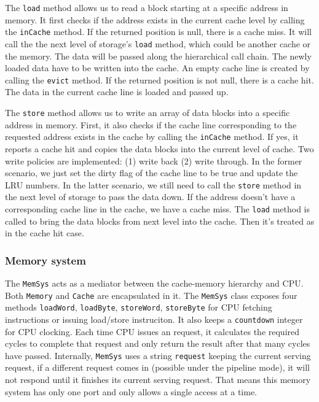 \documentclass{sig-alternate}
\begin{document}
The \texttt{load} method allows us to read a block starting at a specific address in memory. It first checks if the address exists in the current cache level by calling the \texttt{inCache} method. If the returned position is null, there is a cache miss. It will call the the next level of storage's \texttt{load} method, which could be another cache or the memory. The data will be passed along the hierarchical call chain. The newly loaded data have to be written into the cache. An empty cache line is created by calling the \texttt{evict} method. If the returned position is not null, there is a cache hit. The data in the current cache line is loaded and passed up. 

The \texttt{store} method allows us to write an array of data blocks into a specific address in memory. First, it also checks if the cache line corresponding to the requested address exists in the cache by calling the \texttt{inCache} method. If yes, it reports a cache hit and copies the data blocks into the current level of cache. Two write policies are implemented: (1) write back (2) write through. In the former scenario, we just set the dirty flag of the cache line to be true and update the LRU numbers. In the latter scenario, we still need to call the \texttt{store} method in the next level of storage to pass the data down. If the address doesn't have a corresponding cache line in the cache, we have a cache miss. The \texttt{load} method is called to bring the data blocks from next level into the cache. Then it's treated as in the cache hit case. 
 
\subsubsection{Memory system}
The \texttt{MemSys} acts as a mediator between the cache-memory hierarchy and CPU. Both \texttt{Memory} and \texttt{Cache} are encapsulated in it. The \texttt{MemSys} class exposes four methods \texttt{loadWord}, \texttt{loadByte}, \texttt{storeWord}, \texttt{storeByte} for CPU fetching instructions or issuing load/store instruciton. It also keeps a \texttt{countdown} integer for CPU clocking. Each time CPU issues an request, it calculates the required cycles to complete that request and only return the result after that many cycles have passed. Internally, \texttt{MemSys} uses a string \texttt{request} keeping the current serving request, if a different request comes in (possible under the pipeline mode), it will not respond until it finishes its current serving request. That means this memory system has only one port and only allows a single access at a time. 
\end{document}
